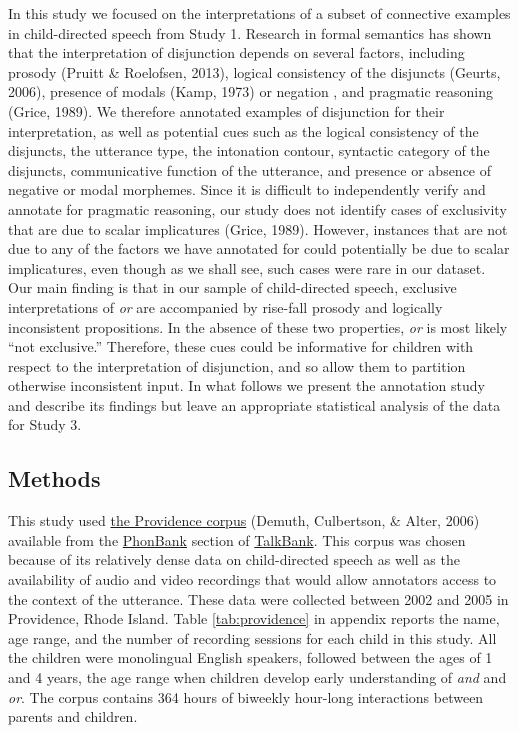 \documentclass[
  english,
  ,man,floatsintext]{apa6}
\begin{document}
In this study we focused on the interpretations of a subset of connective examples in child-directed speech from Study 1. Research in formal semantics has shown that the interpretation of disjunction depends on several factors, including prosody (Pruitt \& Roelofsen, 2013), logical consistency of the disjuncts (Geurts, 2006), presence of modals (Kamp, 1973) or negation , and pragmatic reasoning (Grice, 1989). We therefore annotated examples of disjunction for their interpretation, as well as potential cues such as the logical consistency of the disjuncts, the utterance type, the intonation contour, syntactic category of the disjuncts, communicative function of the utterance, and presence or absence of negative or modal morphemes. Since it is difficult to independently verify and annotate for pragmatic reasoning, our study does not identify cases of exclusivity that are due to scalar implicatures (Grice, 1989). However, instances that are not due to any of the factors we have annotated for could potentially be due to scalar implicatures, even though as we shall see, such cases were rare in our dataset. Our main finding is that in our sample of child-directed speech, exclusive interpretations of \emph{or} are accompanied by rise-fall prosody and logically inconsistent propositions. In the absence of these two properties, \emph{or} is most likely ``not exclusive.'' Therefore, these cues could be informative for children with respect to the interpretation of disjunction, and so allow them to partition otherwise inconsistent input. In what follows we present the annotation study and describe its findings but leave an appropriate statistical analysis of the data for Study 3.

\hypertarget{methods-1}{%
\subsection{Methods}\label{methods-1}}

This study used \href{https://phonbank.talkbank.org/browser/index.php?url=Eng-NA/Providence/}{the Providence corpus} (Demuth, Culbertson, \& Alter, 2006) available from the \href{https://phonbank.talkbank.org}{PhonBank} section of \href{https://talkbank.org/}{TalkBank}. This corpus was chosen because of its relatively dense data on child-directed speech as well as the availability of audio and video recordings that would allow annotators access to the context of the utterance. These data were collected between 2002 and 2005 in Providence, Rhode Island. Table \ref{tab:providence} in appendix reports the name, age range, and the number of recording sessions for each child in this study. All the children were monolingual English speakers, followed between the ages of 1 and 4 years, the age range when children develop early understanding of \emph{and} and \emph{or}. The corpus contains 364 hours of biweekly hour-long interactions between parents and children.
\end{document}
